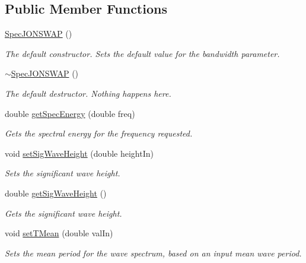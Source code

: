 \subsection*{Public Member Functions}
\begin{DoxyCompactItemize}
\item 
\hyperlink{classosea_1_1_spec_j_o_n_s_w_a_p_a99377683e8e56937854827ad60cca51e}{Spec\-J\-O\-N\-S\-W\-A\-P} ()
\begin{DoxyCompactList}\small\item\em The default constructor. Sets the default value for the bandwidth parameter. \end{DoxyCompactList}\item 
\hyperlink{classosea_1_1_spec_j_o_n_s_w_a_p_a705385fa566b6448caf5c91d72a75c9e}{$\sim$\-Spec\-J\-O\-N\-S\-W\-A\-P} ()
\begin{DoxyCompactList}\small\item\em The default destructor. Nothing happens here. \end{DoxyCompactList}\item 
double \hyperlink{classosea_1_1_spec_j_o_n_s_w_a_p_ad1203c9fe82001079da750d4fb6be231}{get\-Spec\-Energy} (double freq)
\begin{DoxyCompactList}\small\item\em Gets the spectral energy for the frequency requested. \end{DoxyCompactList}\item 
void \hyperlink{classosea_1_1_spec_j_o_n_s_w_a_p_a47b9d089b9ec8c3fafee7c6300b164a0}{set\-Sig\-Wave\-Height} (double height\-In)
\begin{DoxyCompactList}\small\item\em Sets the significant wave height. \end{DoxyCompactList}\item 
double \hyperlink{classosea_1_1_spec_j_o_n_s_w_a_p_aee59dd71b3a66a45c85238ec7f144267}{get\-Sig\-Wave\-Height} ()
\begin{DoxyCompactList}\small\item\em Gets the significant wave height. \end{DoxyCompactList}\item 
void \hyperlink{classosea_1_1_spec_j_o_n_s_w_a_p_a2335041f594251f3412fbe66f4b43a8c}{set\-T\-Mean} (double val\-In)
\begin{DoxyCompactList}\small\item\em Sets the mean period for the wave spectrum, based on an input mean wave period. \end{DoxyCompactList}\item 

\end{DoxyCompactItemize}
